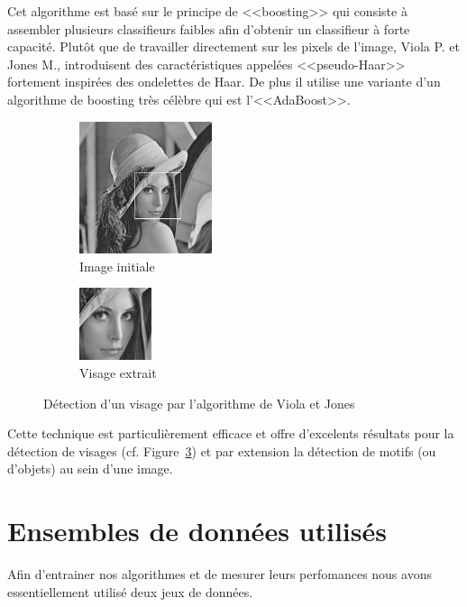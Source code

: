 \documentclass[a4paper,10pt,twocolumn]{extarticle}
\begin{document}
Cet algorithme est basé sur le principe de <<boosting>> qui consiste à assembler plusieurs classifieurs faibles afin d'obtenir un classifieur à forte capacité. Plutôt que de travailler directement sur les pixels de l'image, Viola P. et Jones M., introduisent des caractéristiques appelées <<pseudo-Haar>> fortement inspirées des ondelettes de Haar. De plus il utilise une variante d'un algorithme de boosting très célèbre qui est l'<<AdaBoost>>.
\begin{figure}[H]
        \centering
        \begin{subfigure}[b]{110pt}
                \centering
                \includegraphics[width=110pt]{images_rapport/lena.png}
                \caption{Image initiale}
                \label{fig:lena}
        \end{subfigure}
        \begin{subfigure}[b]{110pt}
                \centering
                \includegraphics[width=60pt]{images_rapport/lena_face.png}
                \caption{Visage extrait}
                \label{fig:lena_face}
        \end{subfigure}
        \caption{Détection d'un visage par l'algorithme de Viola et Jones \cite{viola01} \label{fig:viola_detect}}
\end{figure}
Cette technique est particulièrement efficace et offre d'excelents résultats pour la détection de visages (cf. Figure~\ref{fig:viola_detect}) et par extension la détection de motifs (ou d'objets) au sein d'une image.

\section{Ensembles de données utilisés}
Afin d'entrainer nos algorithmes et de mesurer leurs perfomances nous avons essentiellement utilisé deux jeux de données.
\end{document}
